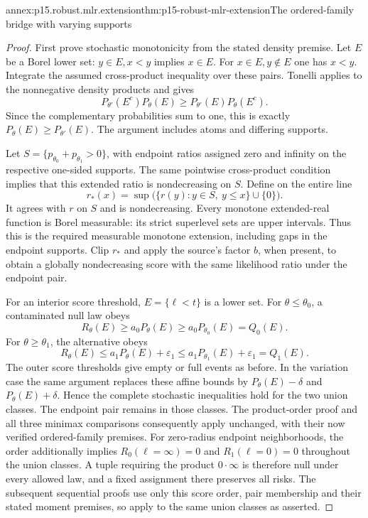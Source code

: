 \begin{annexitem}{annex:p15.robust.mlr.extension}{thm:p15-robust-mlr-extension}{The ordered-family bridge with varying supports}
\begin{proof}
First prove stochastic monotonicity from the stated density premise.
Let \(E\) be a Borel lower set: \(y\in E,x<y\) implies \(x\in E\).
For \(x\in E,y\notin E\) one has \(x<y\).
Integrate the assumed cross-product inequality over these pairs.
Tonelli applies to the nonnegative density products and gives
\[
 P_{\theta'}(E^c)P_\theta(E)
 \geq P_{\theta'}(E)P_\theta(E^c).
\]
Since the complementary probabilities sum to one, this is exactly
\(P_\theta(E)\geq P_{\theta'}(E)\).
The argument includes atoms and differing supports.

Let \(S=\{p_{\theta_0}+p_{\theta_1}>0\}\), with endpoint ratios assigned
zero and infinity on the respective one-sided supports.
The same pointwise cross-product condition implies that this
extended ratio is nondecreasing on \(S\).
Define on the entire line
\[
 r_*(x)=\sup\bigl(\{r(y):y\in S,\ y\leq x\}\cup\{0\}\bigr).
\]
It agrees with \(r\) on \(S\) and is nondecreasing.
Every monotone extended-real function is Borel measurable:
its strict superlevel sets are upper intervals.
Thus this is the required measurable monotone extension, including
gaps in the endpoint supports. Clip \(r_*\) and apply the source's
factor \(b\), when present, to obtain a globally nondecreasing score
with the same likelihood ratio under the endpoint pair.

For an interior score threshold, \(E=\{\ell<t\}\) is a lower set.
For \(\theta\leq\theta_0\), a contaminated null law obeys
\[
 R_\theta(E)\geq a_0P_\theta(E)
 \geq a_0P_{\theta_0}(E)=Q_0(E).
\]
For \(\theta\geq\theta_1\), the alternative obeys
\[
 R_\theta(E)\leq a_1P_\theta(E)+\varepsilon_1
 \leq a_1P_{\theta_1}(E)+\varepsilon_1=Q_1(E).
\]
The outer score thresholds give empty or full events as before.
In the variation case the same argument replaces these affine
bounds by \(P_\theta(E)-\delta\) and \(P_\theta(E)+\delta\).
Hence the complete stochastic inequalities hold for the two union
classes. The endpoint pair remains in those classes.
The product-order proof and all three minimax comparisons consequently
apply unchanged, with their now verified ordered-family premises.
For zero-radius endpoint neighborhoods, the order additionally implies
\(R_0(\ell=\infty)=0\) and \(R_1(\ell=0)=0\) throughout the union
classes. A tuple requiring the product \(0\cdot\infty\) is therefore
null under every allowed law, and a fixed assignment there preserves
all risks. The subsequent sequential proofs use only this score order,
pair membership and their stated moment premises, so apply to the
same union classes as asserted.
\end{proof}
\end{annexitem}

